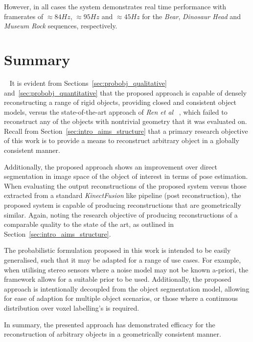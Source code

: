 However, in all cases the system demonstrates real time performance with framerates of 
\( \approx 84Hz \), \( \approx 95Hz \) and \( \approx 45Hz \) for the \textit{Bear}, 
\textit{Dinosaur Head} and \textit{Museum Rock} sequences, respectively.

\section{Summary}
~\label{sec:probobj_discussion}
It is evident from Sections~\ref{sec:probobj_qualitative} and~\ref{sec:probobj_quantitative} 
that the proposed approach is capable of densely reconstructing a range of rigid objects, providing 
closed and consistent object models, versus the state-of-the-art approach of \textit{Ren et al} 
~\cite{Ren2013}, which failed to reconstruct any of the objects with nontrivial geometry that it 
was evaluated on. Recall from Section~\ref{sec:intro_aims_structure} that a primary research objective 
of this work is to provide a means to reconstruct arbitrary object in a globally consistent manner.

Additionally, the proposed approach shows an improvement over direct segmentation 
in image space of the object of interest in terms of pose estimation. When evaluating the output 
reconstructions of the proposed system versus those extracted from a standard \textit{KinectFusion} 
like pipeline (post reconstruction), the proposed system is capable of producing reconstructions that 
are geometrically similar. Again, noting the research objective of producing reconstructions of a 
comparable quality to the state of the art, as outlined in Section~\ref{sec:intro_aims_structure}.

The probabilistic formulation proposed in this work is intended to be easily generalised, such that 
it may be adapted for a range of use cases. For example, when utilising stereo sensors where a noise 
model may not be known a-priori, the framework allows for a suitable prior to be used. Additionally, 
the proposed approach is intentionally decoupled from the object segmentation model, allowing for 
ease of adaption for multiple object scenarios, or those where a continuous distribution over voxel 
labelling's is required.

In summary, the presented approach has demonstrated efficacy for the reconstruction of arbitrary 
objects in a geometrically consistent manner.
